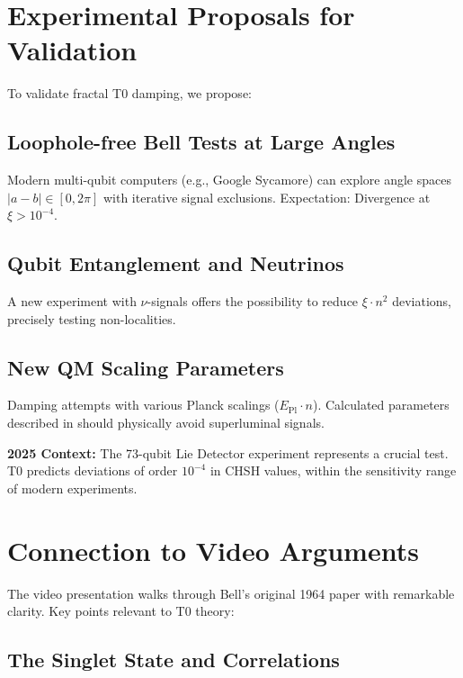 \section{Experimental Proposals for Validation}
\label{sec:experiments}

To validate fractal T0 damping, we propose:

\subsection{Loophole-free Bell Tests at Large Angles}

Modern multi-qubit computers (e.g., Google Sycamore) can explore angle spaces $|a-b| \in [0, 2\pi]$ with iterative signal exclusions. Expectation: Divergence at $\xi > 10^{-4}$.

\subsection{Qubit Entanglement and Neutrinos}

A new experiment with $\nu$-signals offers the possibility to reduce $\xi \cdot n^2$ deviations, precisely testing non-localities.

\subsection{New QM Scaling Parameters}

Damping attempts with various Planck scalings ($E_{\text{Pl}} \cdot n$). Calculated parameters described in \cite{keysight2025} should physically avoid superluminal signals.

\textbf{2025 Context:} The 73-qubit Lie Detector experiment\cite{sciencedaily2025} represents a crucial test. T0 predicts deviations of order $10^{-4}$ in CHSH values, within the sensitivity range of modern experiments.

\section{Connection to Video Arguments}
\label{sec:video_connection}

The video presentation\cite{youtube_bell2025} walks through Bell's original 1964 paper with remarkable clarity. Key points relevant to T0 theory:

\subsection{The Singlet State and Correlations}

